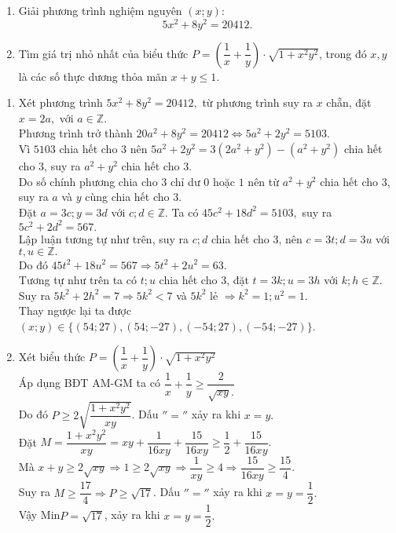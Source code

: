 \begin{ex}%
        \begin{enumerate}
        \item Giải phương trình nghiệm nguyên $(x;y):$
        $$ 5x^2+8y^2=20412.$$ 
        \item Tìm giá trị nhỏ nhất của biểu thức $P = \left( \dfrac{1}{x}+ \dfrac{1}{y}\right) \cdot \sqrt{1+x^2y^2}$, trong đó $x,y$ là các số thực dương thỏa mãn  $x+y \leq 1$.
    \end{enumerate}
\loigiai
    {
    \begin{enumerate}
        \item Xét phương trình $ 5x^2+8y^2=20412,$ từ phương trình suy ra $x$ chẵn, đặt $x=2a,$ với $a \in \mathbb{Z}.$\\
        Phương trình trở thành $20a^2+8y^2=20412 \Leftrightarrow 5a^2+2y^2 =5103.$\\
        Vì $5103$ chia hết cho $3$ nên $5a^2+2y^2 =3(2a^2+y^2)-(a^2+y^2)$ chia hết cho $3$, suy ra $a^2+y^2$ chia hết cho $3$.\\
        Do số chính phương chia cho $3$ chỉ dư $0$ hoặc $1$ nên từ $a^2+y^2$ chia hết cho $3$, suy ra $a$ và $y$ cùng chia hết cho $3$.\\
        Đặt $a=3c; y=3d $ với $c; d \in \mathbb{Z}$. Ta có $45c^2+18d^2=5103,$ suy ra $5c^2+2d^2=567.$\\
        Lập luận tương tự như trên, suy ra $c; d$ chia hết cho $3$, nên $c=3t; d=3u$ với $t, u \in \mathbb{Z}.$\\
        Do đó $45t^2+18u^2=567 \Rightarrow 5t^2+2u^2=63$.\\
        Tương tự như trên ta có $t; u$ chia hết cho $3$, đặt $ t=3k; u=3h$ với $k;h \in \mathbb{Z}$.\\
        Suy ra $5k^2+2h^2=7 \Rightarrow 5k^2 <7$ và $5k^2$ lẻ $\Rightarrow k^2=1; u^2=1$.\\
        Thay ngược lại ta được $(x;y) \in \{ (54;27), (54;-27), (-54;27), (-54;-27)\}$.

        \item Xét biểu thức  $P = \left( \dfrac{1}{x}+ \dfrac{1}{y}\right) \cdot \sqrt{1+x^2y^2}$\\
        Áp dụng BĐT AM-GM ta có $\dfrac{1}{x}+ \dfrac{1}{y} \geq \dfrac{2}{\sqrt{xy}.}$\\
        Do đó $P \geq 2 \sqrt{\dfrac{1+x^2y^2}{xy}}$. Dấu $''=''$ xảy ra khi $x=y.$\\
        Đặt $M = \dfrac{1+x^2y^2}{xy}=xy+\dfrac{1}{16xy}+ \dfrac{15}{16xy} \geq \dfrac{1}{2}+\dfrac{15}{16xy}.$\\
        Mà $x+y \geq 2\sqrt{xy} \Rightarrow 1 \geq 2 \sqrt{xy} \Rightarrow \dfrac{1}{xy} \geq 4 \Rightarrow \dfrac{15}{16xy} \geq \dfrac{15}{4}.$\\
        Suy ra $M\geq \dfrac{17}{4} \Rightarrow P \geq \sqrt{17}$. Dấu $''=''$ xảy ra khi $x=y= \dfrac{1}{2}.$\\
        Vậy Min$P= \sqrt{17}$, xảy ra khi $x=y=\dfrac{1}{2}.$
    \end{enumerate}
    }
\end{ex}

